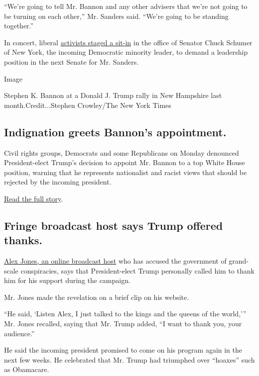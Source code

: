 ``We're going to tell Mr. Bannon and any other advisers that we're not
going to be turning on each other,'' Mr. Sanders said. ``We're going to
be standing together.''

In concert, liberal
\href{https://www.periscope.tv/w/1MYGNOqNzPXJw}{activists staged a
sit-in} in the office of Senator Chuck Schumer of New York, the incoming
Democratic minority leader, to demand a leadership position in the next
Senate for Mr. Sanders.

Image

Stephen K. Bannon at a Donald J. Trump rally in New Hampshire last
month.Credit...Stephen Crowley/The New York Times

\hypertarget{indignation-greets-bannons-appointment}{%
\subsection{Indignation greets Bannon's
appointment.}\label{indignation-greets-bannons-appointment}}

Civil rights groups, Democrats and some Republicans on Monday denounced
President-elect Trump's decision to appoint Mr. Bannon to a top White
House position, warning that he represents nationalist and racist views
that should be rejected by the incoming president.

\href{http://www.nytimes.com/2016/11/15/us/politics/donald-trump-presidency.html}{Read
the full story}.

\hypertarget{fringe-broadcast-host-says-trump-offered-thanks}{%
\subsection{Fringe broadcast host says Trump offered
thanks.}\label{fringe-broadcast-host-says-trump-offered-thanks}}

\href{http://www.infowars.com/watch-alex-jones-show/}{Alex Jones, an
online broadcast host} who has accused the government of grand-scale
conspiracies, says that President-elect Trump personally called him to
thank him for his support during the campaign.

Mr. Jones made the revelation on a brief clip on his website.

``He said, `Listen Alex, I just talked to the kings and the queens of
the world,''' Mr. Jones recalled, saying that Mr. Trump added, ``I want
to thank you, your audience.''

He said the incoming president promised to come on his program again in
the next few weeks. He celebrated that Mr. Trump had triumphed over
``hoaxes'' such as Obamacare.


